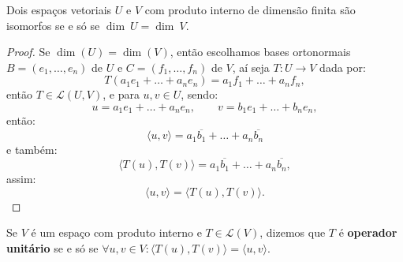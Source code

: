 \documentclass[11pt,twoside,a4paper]{book}
\begin{document}
\begin{corolario}
Dois espaços vetoriais $U$ e $V$ com produto interno de dimensão finita são isomorfos se e só se $\dim \ U=\dim \ V$.
\end{corolario}

\begin{proof}
Se $\dim(U)=\dim(V)$, então escolhamos bases ortonormais $B=(e_1,\dots,e_n)$ de $U$ e $C=(f_1,\dots,f_n)$ de $V$, aí seja $T:U\rightarrow V$ dada por:
\[
T(a_1e_1+\dots+a_ne_n)=a_1f_1+\dots+a_nf_n,
\]
então $T\in\mathcal{L}(U,V)$, e para $u,v\in U$, sendo:
\[
u=a_1e_1+\dots+a_ne_n,\quad\quad v=b_1e_1+\dots+b_ne_n,
\]
então:
\[
\langle u,v\rangle=a_1\overline{b_1}+\dots+a_n\overline{b_n}
\]
e também:
\[
\langle T(u),T(v)\rangle=a_1\overline{b_1}+\dots+a_n\overline{b_n},
\]
assim:
\[
\langle u,v\rangle=\langle T(u),T(v)\rangle.
\]
\end{proof}

\begin{definicao}
Se $V$ é um espaço com produto interno e $T\in\mathcal{L}(V)$, dizemos que $T$ é \textbf{operador unitário} se e só se $\forall u,v\in V:\langle T(u),T(v)\rangle=\langle u,v\rangle$.
\end{definicao}
\end{document}
